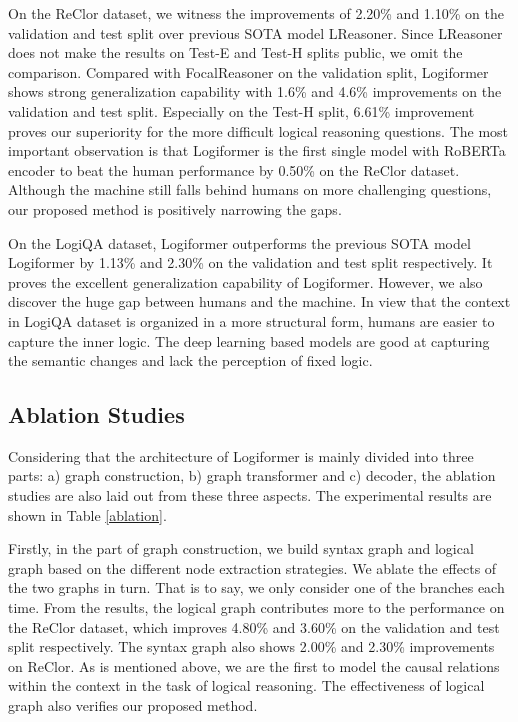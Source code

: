 \documentclass[sigconf]{acmart}
\begin{document}
On the ReClor dataset, we witness the improvements of 2.20\% and 1.10\% on the validation and test split over previous SOTA model LReasoner. Since LReasoner does not make the results on Test-E and Test-H splits public, we omit the comparison. Compared with FocalReasoner on the validation split, Logiformer shows strong generalization capability with 1.6\% and 4.6\% improvements on the validation and test split. Especially on the Test-H split, 6.61\% improvement proves our superiority for the more difficult logical reasoning questions. The most important observation is that Logiformer is the first single model with RoBERTa encoder to beat the human performance by 0.50\% on the ReClor dataset. Although the machine still falls behind humans on more challenging questions, our proposed method is positively narrowing the gaps.

On the LogiQA dataset, Logiformer outperforms the previous SOTA model Logiformer by 1.13\% and 2.30\% on the validation and test split respectively. It proves the excellent generalization capability of Logiformer. However, we also discover the huge gap between humans and the machine. In view that the context in LogiQA dataset is organized in a more structural form, humans are easier to capture the inner logic. The deep learning based models  are good at capturing the semantic changes and lack the perception of fixed logic.

\vspace{-0.3cm}
\subsection{Ablation Studies}
Considering that the architecture of Logiformer is mainly divided into three parts: a) graph construction, b) graph transformer and c) decoder, the ablation studies are also laid out from these three aspects. The experimental results are shown in Table \ref{ablation}.

Firstly, in the part of graph construction, we build syntax graph and logical 
graph based on the different node extraction strategies. We ablate the effects 
of the two graphs in turn. That is to say, we only consider one of the branches 
each time. From the results, the logical graph contributes more to the 
performance on the ReClor dataset, which improves 4.80\% and 3.60\% on the 
validation and test split respectively. The syntax graph also shows 2.00\% and 
2.30\% improvements on ReClor. As is mentioned above, we are the first to model 
the causal relations within the context in the task of logical reasoning. The 
effectiveness of logical graph also verifies our proposed method.
\end{document}
